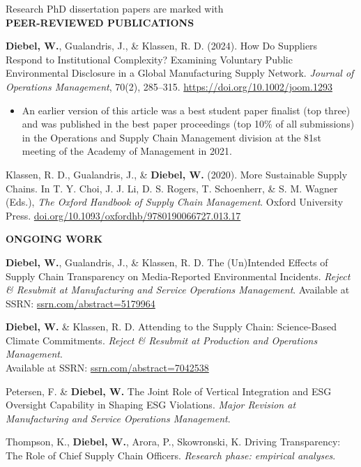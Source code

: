 \documentclass{resume} %
\begin{document}
\begin{rSection}{Research}
\noindent\small{PhD dissertation papers are marked with \docmark}\normalsize\\[1ex]
\MakeUppercase{\bf{Peer-reviewed publications}}

\docmark\textbf{Diebel, W.}, Gualandris, J., \& Klassen, R. D. (2024). How Do Suppliers Respond to Institutional Complexity? Examining Voluntary Public Environmental Disclosure in a Global Manufacturing Supply Network. \textit{Journal of Operations Management}, 70(2), 285--315. \href{https://doi.org/10.1002/joom.1293}{https://doi.org/10.1002/joom.1293}
\begin{itemize}
    \item An earlier version of this article was a best student paper finalist (top three) and was published in the best paper proceedings (top 10\% of all submissions) in the Operations and Supply Chain Management division at the 81st meeting of the Academy of Management in 2021.\medskip
\end{itemize}


Klassen, R. D., Gualandris, J., \& \textbf{Diebel, W.} (2020). More Sustainable Supply Chains. In T. Y. Choi, J. J. Li, D. S. Rogers, T. Schoenherr, \& S. M. Wagner (Eds.), \textit{The Oxford Handbook of Supply Chain Management}. Oxford University Press. \href{https://doi.org/10.1093/oxfordhb/9780190066727.013.17}{doi.org/10.1093/oxfordhb/9780190066727.013.17}

\MakeUppercase{\bf{Ongoing Work}}

\docmark\textbf{Diebel, W.}, Gualandris, J., \& Klassen, R. D. The (Un)Intended Effects of Supply Chain Transparency on Media-Reported Environmental Incidents. \textit{Reject \& Resubmit at Manufacturing and Service Operations Management}. Available at SSRN: \href{https://ssrn.com/abstract=5179964}{ssrn.com/abstract=5179964}

\docmark\textbf{Diebel, W.} \& Klassen, R. D. Attending to the Supply Chain: Science-Based Climate Commitments. \textit{Reject \& Resubmit at Production and Operations Management}.\\ Available at SSRN: \href{https://ssrn.com/abstract=7042538}{ssrn.com/abstract=7042538}

Petersen, F. \& \textbf{Diebel, W.} The Joint Role of Vertical Integration and ESG
Oversight Capability in Shaping ESG Violations. \textit{Major Revision at Manufacturing and Service Operations Management}.

Thompson, K., \textbf{Diebel, W.}, Arora, P., Skowronski, K. Driving Transparency: The Role of Chief Supply Chain Officers. {\em Research phase: empirical analyses}.

\end{rSection}
\end{document}
